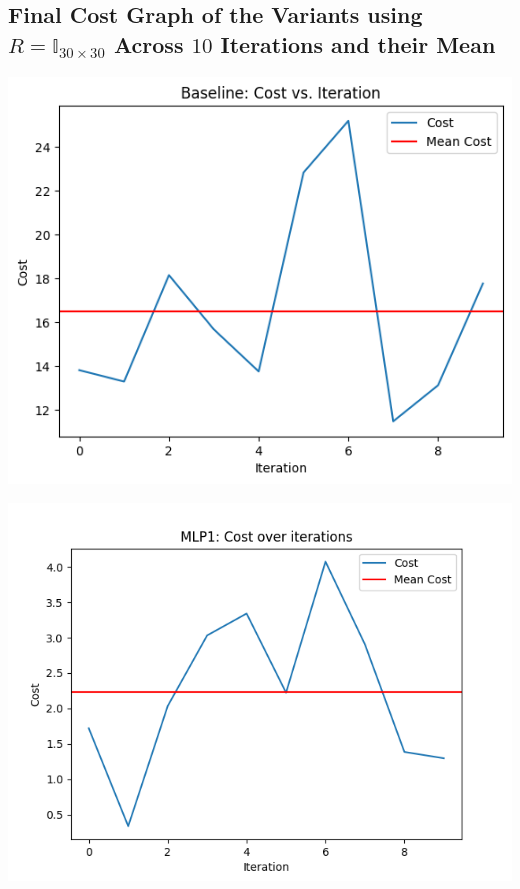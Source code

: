 \documentclass{article}
\begin{document}
\subsection*{Final Cost Graph of the Variants using $R=\mathbb{I}_{30\times30}$ Across $10$ Iterations and their Mean}
\begin{center}
    \includegraphics[scale=0.5]{RI/baseline.png}
\end{center}
\begin{center}
    \includegraphics[scale=0.5]{RI/MLP1.png}
\end{center}
\end{document}
